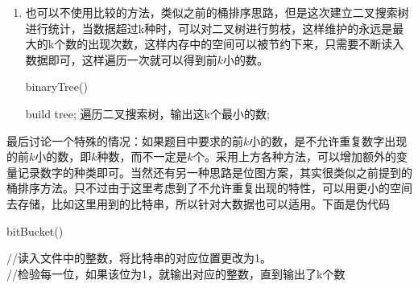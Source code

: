 \documentclass[12pt,a4paper]{article}
\theoremstyle{definition}
\begin{document}
\begin{enumerate}
	\item 也可以不使用比较的方法，类似之前的桶排序思路，但是这次建立二叉搜索树进行统计，当数据超过k种时，可以对二叉树进行剪枝，这样维护的永远是最大的k个数的出现次数，这样内存中的空间可以被节约下来，只需要不断读入数据即可，这样遍历一次就可以得到前$k$小的数。
	\begin{center}
		\begin{algorithm}[H]
			\caption{binaryTree()}
			build tree;
		遍历二叉搜索树，输出这k个最小的数;\\
		\end{algorithm}
	\end{center}
\end{enumerate}	
	最后讨论一个特殊的情况：如果题目中要求的前$k$小的数，是不允许重复数字出现的前$k$小的数，即$k$种数，而不一定是$k$个。采用上方各种方法，可以增加额外的变量记录数字的种类即可。当然还有另一种思路是位图方案，其实很类似之前提到的桶排序方法。只不过由于这里考虑到了不允许重复出现的特性，可以用更小的空间去存储，比如这里用到的比特串，所以针对大数据也可以适用。下面是伪代码
	\begin{center}
		\begin{algorithm}[H]
			\caption{bitBucket()}
			//读入文件中的整数，将比特串的对应位置更改为1。\\
			//检验每一位，如果该位为1，就输出对应的整数，直到输出了k个数\\ 			
		\end{algorithm}
	\end{center}
\end{document}
